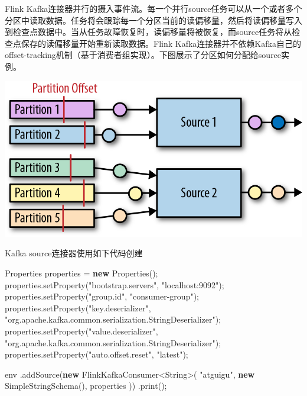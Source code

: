 \documentclass[cn,11pt,chinese]{elegantbook}
\newenvironment{Shaded}{}{}
\newcommand{\BuiltInTok}[1]{#1}
\newcommand{\FunctionTok}[1]{\textcolor[rgb]{0.02,0.16,0.49}{#1}}
\newcommand{\KeywordTok}[1]{\textcolor[rgb]{0.00,0.44,0.13}{\textbf{#1}}}
\newcommand{\NormalTok}[1]{#1}
\newcommand{\StringTok}[1]{\textcolor[rgb]{0.25,0.44,0.63}{#1}}
\begin{document}
Flink
Kafka连接器并行的摄入事件流。每一个并行source任务可以从一个或者多个分区中读取数据。任务将会跟踪每一个分区当前的读偏移量，然后将读偏移量写入到检查点数据中。当从任务故障恢复时，读偏移量将被恢复，而source任务将从检查点保存的读偏移量开始重新读取数据。Flink
Kafka连接器并不依赖Kafka自己的offset-tracking机制（基于消费者组实现）。下图展示了分区如何分配给source实例。

\includegraphics{images/spaf_0801.png}

Kafka source连接器使用如下代码创建

\begin{Shaded}
\begin{Highlighting}[]
\BuiltInTok{Properties}\NormalTok{ properties = }\KeywordTok{new} \BuiltInTok{Properties}\NormalTok{();}
\NormalTok{properties.}\FunctionTok{setProperty}\NormalTok{(}\StringTok{"bootstrap.servers"}\NormalTok{, }\StringTok{"localhost:9092"}\NormalTok{);}
\NormalTok{properties.}\FunctionTok{setProperty}\NormalTok{(}\StringTok{"group.id"}\NormalTok{, }\StringTok{"consumer{-}group"}\NormalTok{);}
\NormalTok{properties.}\FunctionTok{setProperty}\NormalTok{(}\StringTok{"key.deserializer"}\NormalTok{, }\StringTok{"org.apache.kafka.common.serialization.StringDeserializer"}\NormalTok{);}
\NormalTok{properties.}\FunctionTok{setProperty}\NormalTok{(}\StringTok{"value.deserializer"}\NormalTok{, }\StringTok{"org.apache.kafka.common.serialization.StringDeserializer"}\NormalTok{);}
\NormalTok{properties.}\FunctionTok{setProperty}\NormalTok{(}\StringTok{"auto.offset.reset"}\NormalTok{, }\StringTok{"latest"}\NormalTok{);}

\NormalTok{env}
\NormalTok{    .}\FunctionTok{addSource}\NormalTok{(}\KeywordTok{new}\NormalTok{ FlinkKafkaConsumer\textless{}}\BuiltInTok{String}\NormalTok{\textgreater{}(}
        \StringTok{"atguigu"}\NormalTok{,}
        \KeywordTok{new} \FunctionTok{SimpleStringSchema}\NormalTok{(),}
\NormalTok{        properties}
\NormalTok{    ))}
\NormalTok{    .}\FunctionTok{print}\NormalTok{();}
\end{Highlighting}
\end{Shaded}
\end{document}

